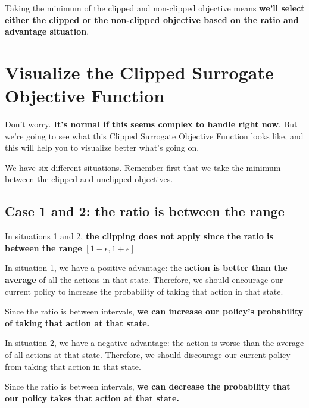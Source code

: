 \documentclass[11pt,a4paper]{article}
\begin{document}
Taking the minimum of the clipped and non-clipped objective means \textbf{we'll select either the clipped or the non-clipped objective based on the ratio and advantage situation}.

\section{Visualize the Clipped Surrogate Objective Function}\label{visualize-the-clipped-surrogate-objective-function}

Don't worry. \textbf{It's normal if this seems complex to handle right now}. But we're going to see what this Clipped Surrogate Objective Function looks like, and this will help you to visualize better what's going on.


We have six different situations. Remember first that we take the minimum between the clipped and unclipped objectives.

\subsection{Case 1 and 2: the ratio is between the range}\label{case-1-and-2-the-ratio-is-between-the-range}

In situations 1 and 2, \textbf{the clipping does not apply since the ratio is between the range} \([1 - \epsilon, 1 + \epsilon]\)

In situation 1, we have a positive advantage: the \textbf{action is better than the average} of all the actions in that state. Therefore, we should encourage our current policy to increase the probability of taking that action in that state.

Since the ratio is between intervals, \textbf{we can increase our policy's probability of taking that action at that state.}

In situation 2, we have a negative advantage: the action is worse than the average of all actions at that state. Therefore, we should discourage our current policy from taking that action in that state.

Since the ratio is between intervals, \textbf{we can decrease the probability that our policy takes that action at that state.}
\end{document}
